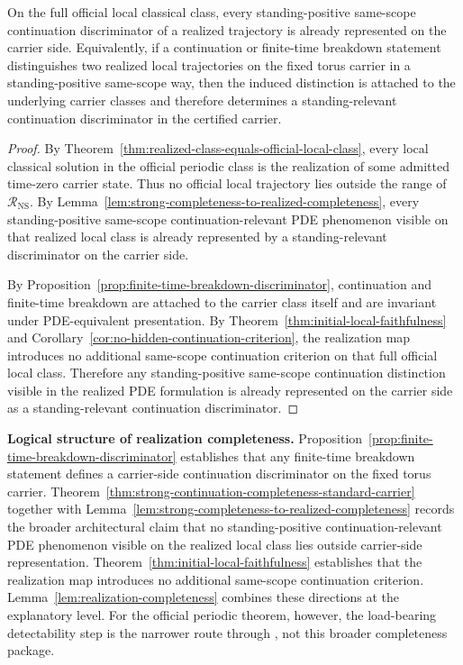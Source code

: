 \begin{lemma}\label{lem:realization-completeness}
On the full official local classical class, every standing-positive same-scope continuation discriminator of a realized trajectory is already represented on the carrier side. Equivalently, if a continuation or finite-time breakdown statement distinguishes two realized local trajectories on the fixed torus carrier in a standing-positive same-scope way, then the induced distinction is attached to the underlying carrier classes and therefore determines a standing-relevant continuation discriminator in the certified carrier.
\end{lemma}

\begin{proof}
By Theorem~\ref{thm:realized-class-equals-official-local-class}, every local classical solution in the
official periodic class is the realization of some admitted time-zero carrier state. Thus no official local trajectory lies outside the range of $\mathcal R_{\mathrm{NS}}$. By Lemma~\ref{lem:strong-completeness-to-realized-completeness}, every standing-positive same-scope continuation-relevant PDE phenomenon visible on that realized local class is already represented by a standing-relevant discriminator on the carrier side.

By Proposition~\ref{prop:finite-time-breakdown-discriminator}, continuation and finite-time
breakdown are attached to the carrier class itself and are invariant under PDE-equivalent
presentation. By Theorem~\ref{thm:initial-local-faithfulness} and
Corollary~\ref{cor:no-hidden-continuation-criterion}, the realization map introduces no additional
same-scope continuation criterion on that full official local class. Therefore any standing-positive same-scope continuation distinction visible in the realized PDE formulation is already represented on the carrier side as a standing-relevant continuation discriminator.
\end{proof}

\medskip
\noindent\textbf{Logical structure of realization completeness.} Proposition~\ref{prop:finite-time-breakdown-discriminator} establishes that any finite-time breakdown statement defines a carrier-side continuation discriminator on the fixed torus carrier. Theorem~\ref{thm:strong-continuation-completeness-standard-carrier} together with Lemma~\ref{lem:strong-completeness-to-realized-completeness} records the broader architectural claim that no standing-positive continuation-relevant PDE phenomenon visible on the realized local class lies outside carrier-side representation. Theorem~\ref{thm:initial-local-faithfulness} establishes that the realization map introduces no additional same-scope continuation criterion. Lemma~\ref{lem:realization-completeness} combines these directions at the explanatory level. For the official periodic theorem, however, the load-bearing detectability step is the narrower route through \HorizonDetectabilityRef{}, not this broader completeness package.


